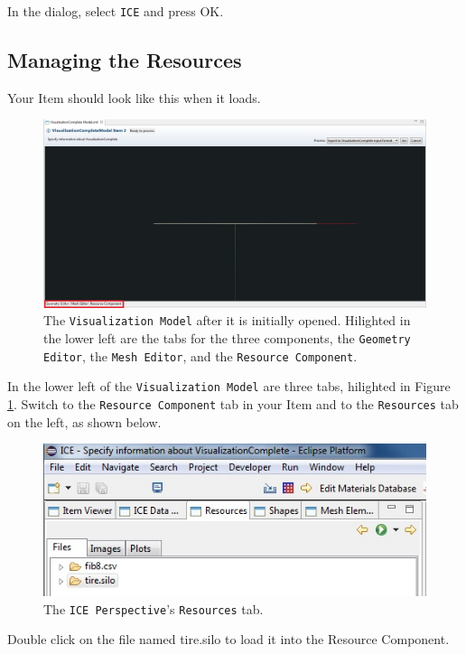 In the dialog, select \texttt{ICE} and press {OK}.

\subsection{Managing the Resources}

Your Item should look like this when it loads.

\begin{figure}[!h]
\includegraphics[width=12cm]{images/ItemTabs}
\centering
\caption{The \texttt{Visualization Model} after it is initially opened.
Hilighted in the lower left are the tabs for the three components, the
\texttt{Geometry Editor}, the \texttt{Mesh Editor}, and the \texttt{Resource
Component}.}
\label{fig:itemtabs}
\end{figure}

In the lower left of the \texttt{Visualization Model} are three tabs, hilighted
in Figure \ref{fig:itemtabs}.
Switch to the \texttt{Resource Component} tab in your Item and to the
\texttt{Resources} tab on the left, as shown below.

\begin{figure}[!h]
\includegraphics[width=12cm]{images/ResourcesTab}
\centering
\caption{The \texttt{ICE Perspective}'s \texttt{Resources} tab.}
\label{fig:resourcestab}
\end{figure}

Double click on the file named tire.silo to load it into the Resource
Component.

